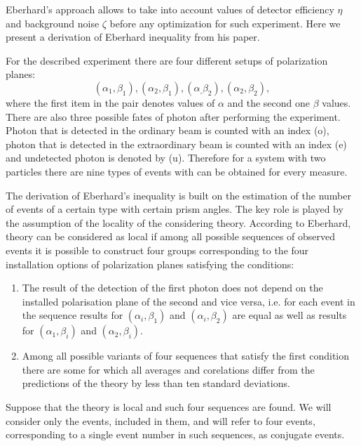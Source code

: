 \documentclass[11pt]{article}
\begin{document}
Eberhard's approach allows to take into account values of detector efficiency $\eta$ and background noise $\zeta$ before any optimization for such experiment. Here we present a derivation of Eberhard inequality from his paper. 


For the described experiment there are four different setups of polarization planes: \[
(\alpha_1, \beta_1), (\alpha_2, \beta_1), (\alpha_, \beta_2), (\alpha_2, \beta_2),
\] 
where the first item in the pair denotes values of $\alpha$ and the second one $\beta$ values. There are also three possible fates of photon after performing the experiment. Photon that is detected in the ordinary beam is counted with an index (o), photon that is detected in the extraordinary beam is counted with an index (e) and undetected photon is denoted by (u). Therefore for a system with two particles there are nine types of events with can be obtained for every measure.

The derivation of Eberhard's inequality is built on the estimation of the number of events of a certain type with certain prism angles. The key role is played by the assumption of the locality of the considering theory. According to Eberhard, theory can be considered as local if among all possible sequences of observed events it is possible to construct four groups corresponding to the four installation options of polarization planes satisfying the conditions:
\begin{enumerate}[label=(\roman*)]
\item The result of the detection of the first photon does not depend on the installed
polarisation plane of the second and vice versa, i.e. for each event in the sequence results for $(\alpha_i, \beta_1)$ and $(\alpha_i, \beta_2)$ are equal as well as results for $(\alpha_1, \beta_i)$ and $(\alpha_2, \beta_i)$.
\item  Among all possible variants of four sequences that satisfy the first condition there are some for which all averages and corelations differ from the predictions of the theory by less than ten standard deviations.
\end{enumerate}

Suppose that the theory is local and such four sequences are found. We will consider only the events, included in them, and will refer to four events, corresponding to a single event number in such sequences, as conjugate events.
\end{document}
